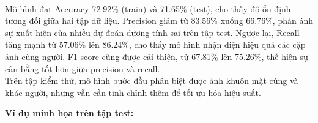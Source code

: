 {\vspace{0.5em}

\noindent
\paragraph{}{Mô hình đạt Accuracy 72.92\% (train) và 71.65\% (test), cho thấy độ ổn định tương đối giữa hai tập dữ liệu. Precision giảm từ 83.56\% xuống 66.76\%, phản ánh sự xuất hiện của nhiều dự đoán dương tính sai trên tập test. Ngược lại, Recall tăng mạnh từ 57.06\% lên 86.24\%, cho thấy mô hình nhận diện hiệu quả các cặp ảnh cùng người. F1-score cũng được cải thiện, từ 67.81\% lên 75.26\%, thể hiện sự cân bằng tốt hơn giữa precision và recall. \\

Trên tập kiểm thử, mô hình bước đầu phân biệt được ảnh khuôn mặt cùng và khác người, nhưng vẫn cần tinh chỉnh thêm để tối ưu hóa hiệu suất.}

\vspace{0.5em}
\noindent
\textbf{Ví dụ minh họa trên tập test:}

}
